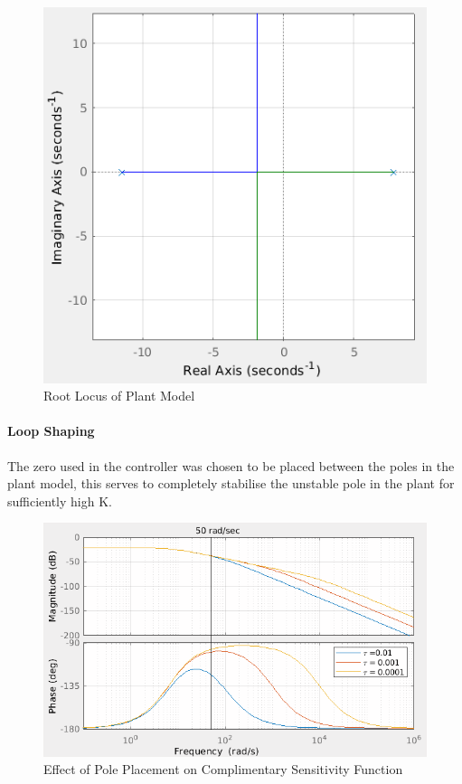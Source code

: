 \documentclass[11pt, a4paper,twocolumn]{article}
\begin{document}
		\begin{figure}[h!]
			\centering
			\includegraphics[scale=0.4]{rlocus_plant}
			\caption{Root Locus of Plant Model}
			\label{fig:rl_plnt}
		\end{figure}
						
			
	\paragraph{		Loop Shaping\\		}
			The zero used in the controller was chosen to be placed between the poles in the plant model, this serves to completely stabilise the unstable pole in the plant for sufficiently high K. 
			
			\begin{figure}[ht!]
			\centering
			\includegraphics[scale=0.35]{vary_p}
			\caption{Effect of Pole Placement on Complimentary Sensitivity Function}
			\label{fig:vary_p}
			\end{figure}			
			
\end{document}
